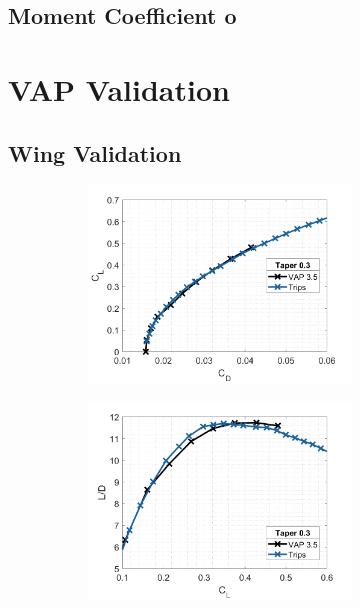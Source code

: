 \begin{figure}
\subsection{Moment Coefficient o}


\section{VAP Validation}

\subsection{Wing Validation}


\begin{figure}[H]
     \centering
     \begin{subfigure}[b]{0.45\textwidth}
         \centering
         \includegraphics[width=\textwidth]{05_Results/Figs/VAP/genMAV/taper3a.png}

     \end{subfigure}
     \hfill
     \begin{subfigure}[b]{0.45\textwidth}
         \centering
         \includegraphics[width=\textwidth]{05_Results/Figs/VAP/genMAV/taper3b.png}
      

\end{subfigure}
\end{figure}
\end{figure}
